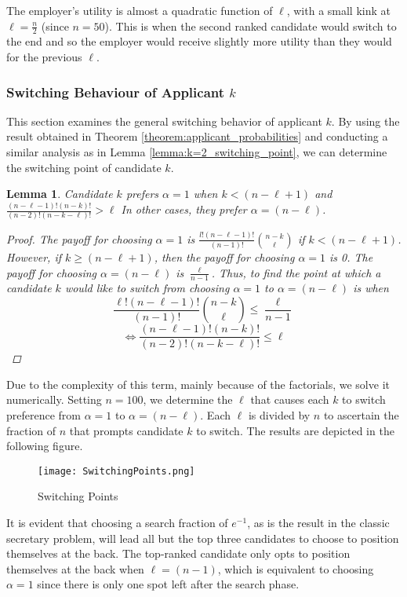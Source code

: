 \documentclass{article}
\newtheorem{lemma}{Lemma}
\begin{document}
The employer's utility is almost a quadratic function of $\ell$, with a small kink at $\ell=\frac{n}{2}$ (since $n=50$). This is when the second ranked candidate would switch to the end and so the employer would receive slightly more utility than they would for the previous $\ell$.

\subsubsection{Switching Behaviour of Applicant \texorpdfstring{$k$}{k}}

This section examines the general switching behavior of applicant $k$. By using the result obtained in Theorem \ref{theorem:applicant_probabilities} and conducting a similar analysis as in Lemma \ref{lemma:k=2_switching_point}, we can determine the switching point of candidate $k$.
\begin{lemma}
    Candidate $k$ prefers $\alpha=1$ when $k<(n-\ell+1)$ and $\frac{(n-\ell-1)!(n-k)!}{(n-2)!(n-k-\ell)!} > \ell $ In other cases, they prefer $\alpha = (n-\ell)$.
\begin{proof}
    The payoff for choosing $\alpha=1$ is $\frac{l!(n-\ell-1)!}{(n-1)!}\binom{n-k}{\ell}$ if $k<(n-\ell+1)$. However, if $k\geq(n-\ell+1)$, then the payoff for choosing $\alpha=1$ is 0. The payoff for choosing $\alpha=(n-\ell)$ is $\frac{\ell}{n-1}$. Thus, to find the point at which a candidate $k$ would like to switch from choosing $\alpha=1$ to $\alpha=(n-\ell)$ is when $$\frac{\ell!(n-\ell-1)!}{(n-1)!}\binom{n-k}{\ell} \leq \frac{\ell}{n-1}$$ 
    $$ \iff \frac{(n-\ell-1)!(n-k)!}{(n-2)!(n-k-\ell)!} \leq \ell $$ 
\end{proof}
\end{lemma}

Due to the complexity of this term, mainly because of the factorials, we solve it numerically. Setting $n=100$, we determine the $\ell$ that causes each $k$ to switch preference from $\alpha=1$ to $\alpha = (n-\ell)$. Each $\ell$ is divided by $n$ to ascertain the fraction of $n$ that prompts candidate $k$ to switch. The results are depicted in the following figure.

\begin{figure}[H]
\centering
\centering
\texttt{[image: SwitchingPoints.png]}
\caption{Switching Points}
\label{fig:switching_points}
\end{figure}

It is evident that choosing a search fraction of $e^{-1}$, as is the result in the classic secretary problem, will lead all but the top three candidates to choose to position themselves at the back. The top-ranked candidate only opts to position themselves at the back when $\ell=(n-1)$, which is equivalent to choosing $\alpha=1$ since there is only one spot left after the search phase.
\end{document}
